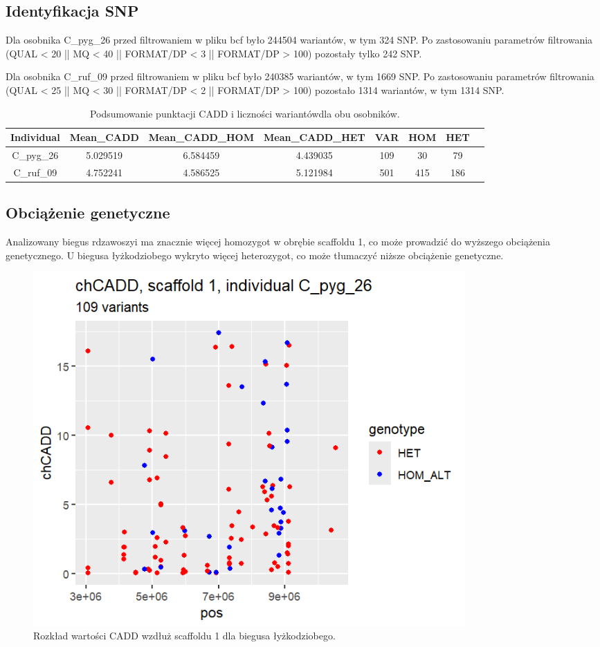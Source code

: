\documentclass[a4paper, 12pt]{article}
\begin{document}
\subsection{Identyfikacja SNP}
Dla osobnika C\_pyg\_26 przed filtrowaniem w pliku bcf było 244504 wariantów, w tym 324 SNP. Po zastosowaniu parametrów filtrowania (QUAL < 20 || MQ < 40 || FORMAT/DP < 3 || FORMAT/DP > 100) pozostały tylko 242 SNP.

Dla osobnika C\_ruf\_09 przed filtrowaniem w pliku bcf było 240385 wariantów, w tym 1669 SNP. Po zastosowaniu parametrów filtrowania (QUAL < 25 || MQ < 30 || FORMAT/DP < 2 || FORMAT/DP > 100) pozostało 1314 wariantów, w tym 1314 SNP.

\begin{table}[H]
    \centering
    \begin{tabular}{|c|c|c|c|c|c|c|c|}
        \hline
        Individual & Mean\_CADD & Mean\_CADD\_HOM & Mean\_CADD\_HET & VAR & HOM & HET \\
        \hline
        C\_pyg\_26 & 5.029519 & 6.584459 & 4.439035 & 109 & 30 & 79 \\
        \hline
        C\_ruf\_09 & 4.752241 & 4.586525 & 5.121984 & 501 & 415 & 186 \\
        \hline
    \end{tabular}
    \caption{Podsumowanie punktacji CADD i liczności wariantówdla obu osobników.}
    \label{tab:cadd_summary}
\end{table}

\subsection{Obciążenie genetyczne}
Analizowany biegus rdzawoszyi ma znacznie więcej homozygot w obrębie scaffoldu 1, co może prowadzić do wyższego obciążenia genetycznego. U biegusa łyżkodziobego wykryto więcej heterozygot, co może tłumaczyć niższe obciążenie genetyczne.

\begin{figure}[H]
    \centering
    \includegraphics[width=0.8\textwidth]{img/chCADD_C_pyg_26.png}
    \caption{Rozkład wartości CADD wzdłuż scaffoldu 1 dla biegusa łyżkodziobego.}
    \label{fig:cadd_pyg}
\end{figure}
\end{document}
